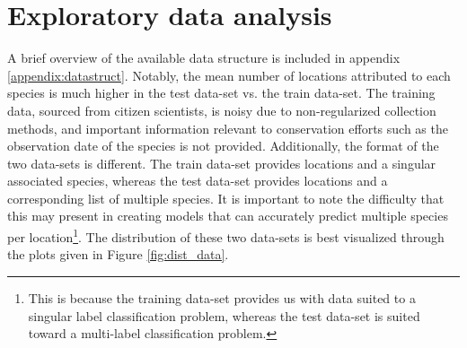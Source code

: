 \section{Exploratory data analysis} \label{sec:explore}


A brief overview of the available data structure is included in appendix \ref{appendix:datastruct}. Notably, the mean number of locations attributed to each species is much higher in the test data-set vs. the train data-set. The training data, sourced from citizen scientists, is noisy due to non-regularized collection methods, and important information relevant to  conservation efforts such as the observation date of the species is not provided. 
Additionally, the format of the two data-sets is different. The train data-set provides locations and a singular associated species, whereas the test data-set provides locations and a corresponding list of multiple species. It is important to note the difficulty that this may present in creating models that can accurately predict multiple species per location\footnote{This is because the training data-set provides us with data suited to a singular label classification problem, whereas the test data-set is suited toward a multi-label classification problem.}. The distribution of these two data-sets is best visualized through the plots given in Figure \ref{fig:dist_data}.

